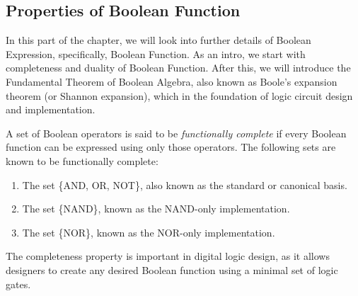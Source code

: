     \subsection{Properties of Boolean Function}
    In this part of the chapter, we will look into further details of Boolean Expression, specifically, Boolean Function. As an intro, we start with completeness
    and duality of Boolean Function. After this, we will introduce the Fundamental Theorem of Boolean Algebra, also known as Boole's expansion theorem (or Shannon expansion), 
    which in the foundation of logic circuit design and implementation.
    \begin{theorem}
        A set of Boolean operators is said to be \textit{functionally complete} if every Boolean function can be expressed using only those operators. The following sets are known to be functionally complete:

        \begin{enumerate}
            \item The set \{AND, OR, NOT\}, also known as the standard or canonical basis.
            \item The set \{NAND\}, known as the NAND-only implementation.
            \item The set \{NOR\}, known as the NOR-only implementation.
        \end{enumerate}

        The completeness property is important in digital logic design, as it allows designers to create any desired Boolean function using a minimal set of logic gates.
    \end{theorem}

